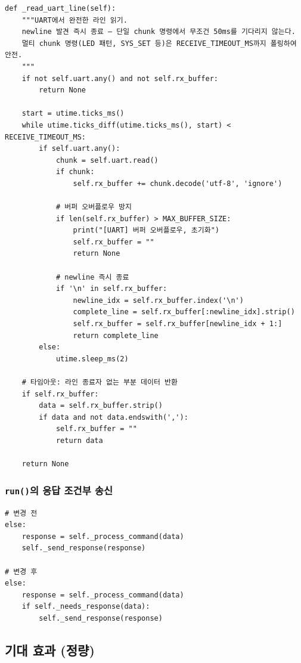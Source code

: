 \documentclass[11pt, oneside]{article}
\begin{document}
\begin{verbatim}
def _read_uart_line(self):
    """UART에서 완전한 라인 읽기.
    newline 발견 즉시 종료 — 단일 chunk 명령에서 무조건 50ms를 기다리지 않는다.
    멀티 chunk 명령(LED 패턴, SYS_SET 등)은 RECEIVE_TIMEOUT_MS까지 폴링하여 안전.
    """
    if not self.uart.any() and not self.rx_buffer:
        return None

    start = utime.ticks_ms()
    while utime.ticks_diff(utime.ticks_ms(), start) < RECEIVE_TIMEOUT_MS:
        if self.uart.any():
            chunk = self.uart.read()
            if chunk:
                self.rx_buffer += chunk.decode('utf-8', 'ignore')

            # 버퍼 오버플로우 방지
            if len(self.rx_buffer) > MAX_BUFFER_SIZE:
                print("[UART] 버퍼 오버플로우, 초기화")
                self.rx_buffer = ""
                return None

            # newline 즉시 종료
            if '\n' in self.rx_buffer:
                newline_idx = self.rx_buffer.index('\n')
                complete_line = self.rx_buffer[:newline_idx].strip()
                self.rx_buffer = self.rx_buffer[newline_idx + 1:]
                return complete_line
        else:
            utime.sleep_ms(2)

    # 타임아웃: 라인 종료자 없는 부분 데이터 반환
    if self.rx_buffer:
        data = self.rx_buffer.strip()
        if data and not data.endswith(','):
            self.rx_buffer = ""
            return data

    return None
\end{verbatim}

\subsubsection*{\texttt{run()}의 응답 조건부 송신}

\begin{verbatim}
# 변경 전
else:
    response = self._process_command(data)
    self._send_response(response)

# 변경 후
else:
    response = self._process_command(data)
    if self._needs_response(data):
        self._send_response(response)
\end{verbatim}

\subsection{기대 효과 (정량)}
\end{document}
